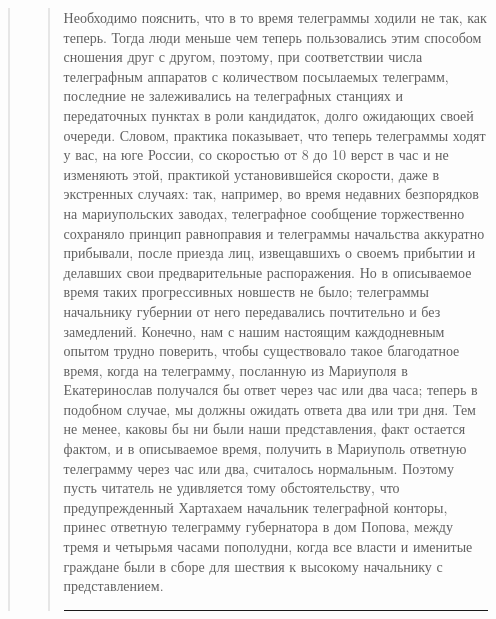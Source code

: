 \begin{quote}
\begin{quote}
Необходимо пояснить, что в то время телеграммы ходили не так, как теперь. 
Тогда люди меньше чем теперь пользовались этим способом сношения друг с другом,
поэтому, при соответствии числа телеграфным аппаратов с
количеством посылаемых телеграмм, последние не залеживались на телеграфных станциях 
и передаточных пунктах в роли кандидаток, долго ожидающих своей очереди.
Словом, практика показывает, что теперь телеграммы ходят у вас, на юге России, 
со скоростью от 8 до 10 верст в час и не изменяють этой, практикой установившейся скорости, 
даже в экстренных случаях: так, например, во время недавних безпорядков на 
мариупольских заводах, телеграфное сообщение торжественно сохраняло
принцип равноправия и телеграммы начальства аккуратно
прибывали, после приезда лиц, извещавшихъ о своемъ прибытии
и делавших свои предварительные распоражения. Но
в описываемое время таких прогрессивных новшеств не
было; телеграммы начальнику губернии от него передавались 
почтительно и без замедлений. Конечно, нам с нашим настоящим каждодневным 
опытом трудно поверить,
чтобы существовало такое благодатное время, когда на телеграмму, посланную из Мариуполя в 
Екатеринослав получался бы ответ через час или два часа; 
теперь в подобном случае, мы должны ожидать ответа два или три
дня. Тем не менее, каковы бы ни были наши представления,
факт остается фактом, и в описываемое время, получить
в Мариуполь ответную телеграмму через час или два,
считалось нормальным. Поэтому пусть читатель не удивляется 
тому обстоятельству, что предупрежденный Хартахаем
начальник телеграфной конторы, принес ответную телеграмму 
губернатора в дом Попова, между тремя и четырьмя
часами пополудни, когда все власти и именитые граждане
были в сборе для шествия к высокому начальнику с
представлением.

\par\noindent\rule{\textwidth}{0.4pt}


\end{quote}
\end{quote}
